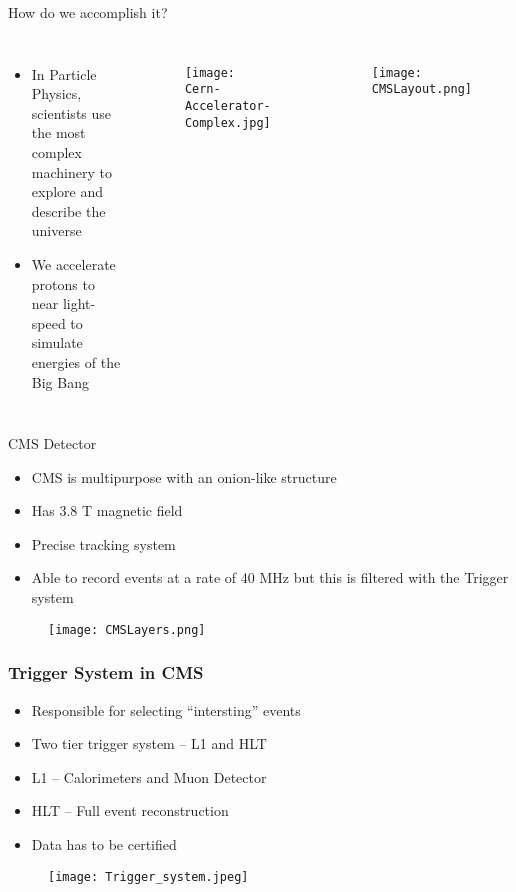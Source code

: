 \documentclass[9pt,aspectratio=169]{beamer}
\begin{document}
\begin{frame}{How do we accomplish it?}
	\begin{columns}
		\begin{itemize}
			\item In Particle Physics, scientists use the most complex machinery to explore and describe the universe
			\item We accelerate protons to near light-speed to simulate energies of the Big Bang
		\end{itemize}
		\begin{figure}
			\centering
			\texttt{[image: Cern-Accelerator-Complex.jpg]}
		\end{figure}
		\begin{figure}
			\centering
			\texttt{[image: CMSLayout.png]}
		\end{figure}
	\end{columns}
\end{frame}

\begin{frame}{CMS Detector}
	\begin{itemize}
		\item CMS is multipurpose with an onion-like structure
		\item Has 3.8 T magnetic field
		\item Precise tracking system
		\item Able to record events at a rate of 40 MHz but this is filtered with the Trigger system
	\end{itemize}
	\begin{figure}
		\centering
		\texttt{[image: CMSLayers.png]}
	\end{figure}
\end{frame}

\begin{frame}
	\frametitle{Trigger System in CMS}
	\begin{itemize}
		\item Responsible for selecting ``intersting'' events
		\item Two tier trigger system -- L1 and HLT
		\item L1 -- Calorimeters and Muon Detector
		\item HLT -- Full event reconstruction
		\item Data has to be certified
	\end{itemize}
	\vfill
	\begin{figure}
		\texttt{[image: Trigger\_system.jpeg]}
	\end{figure}

\end{frame}
\end{document}
